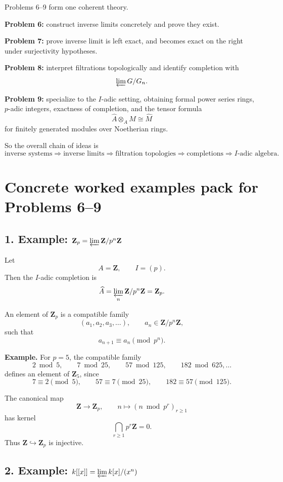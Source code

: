 \documentclass[12pt,a4paper]{article}
\theoremstyle{plain}
\theoremstyle{definition}      %
\begin{document}
Problems 6--9 form one coherent theory.

\medskip
\textbf{Problem 6:} construct inverse limits concretely and prove they exist.

\textbf{Problem 7:} prove inverse limit is left exact, and becomes exact on the right under surjectivity hypotheses.

\textbf{Problem 8:} interpret filtrations topologically and identify completion with
\[
\varprojlim G/G_n.
\]

\textbf{Problem 9:} specialize to the \(I\)-adic setting, obtaining formal power series rings, \(p\)-adic integers, exactness of completion, and the tensor formula
\[
\widehat A\otimes_A M \cong \widehat M
\]
for finitely generated modules over Noetherian rings.

So the overall chain of ideas is
\[
\text{inverse systems}
\Longrightarrow
\text{inverse limits}
\Longrightarrow
\text{filtration topologies}
\Longrightarrow
\text{completions}
\Longrightarrow
I\text{-adic algebra}.
\]

\section*{Concrete worked examples pack for Problems 6--9}

\subsection*{1. Example: \(\mathbf Z_p=\varprojlim \mathbf Z/p^n\mathbf Z\)}

Let
\[
A=\mathbf Z,\qquad I=(p).
\]
Then the \(I\)-adic completion is
\[
\widehat A=\varprojlim_n \mathbf Z/p^n\mathbf Z=\mathbf Z_p.
\]

An element of \(\mathbf Z_p\) is a compatible family
\[
(a_1,a_2,a_3,\dots),\qquad a_n\in \mathbf Z/p^n\mathbf Z,
\]
such that
\[
a_{n+1}\equiv a_n \pmod{p^n}.
\]

\textbf{Example.}
For \(p=5\), the compatible family
\[
2 \bmod 5,\qquad
7 \bmod 25,\qquad
57 \bmod 125,\qquad
182 \bmod 625,\dots
\]
defines an element of \(\mathbf Z_5\), since
\[
7\equiv 2 \pmod 5,\qquad
57\equiv 7 \pmod{25},\qquad
182\equiv 57 \pmod{125}.
\]

The canonical map
\[
\mathbf Z\to \mathbf Z_p,\qquad n\mapsto (n\bmod p^r)_{r\ge1}
\]
has kernel
\[
\bigcap_{r\ge1} p^r\mathbf Z=0.
\]
Thus \(\mathbf Z\hookrightarrow \mathbf Z_p\) is injective.

\subsection*{2. Example: \(k[[x]]=\varprojlim k[x]/(x^n)\)}
\end{document}
